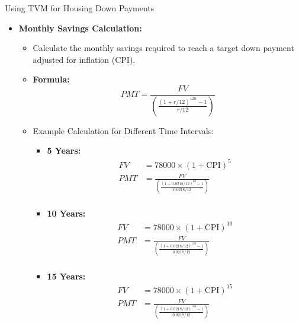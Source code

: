 \documentclass{beamer}
\begin{document}
\begin{frame}{Using TVM for Housing Down Payments}
    \begin{itemize}
        \item \textbf{Monthly Savings Calculation:}
        \begin{itemize}
            \item Calculate the monthly savings required to reach a target down payment adjusted for inflation (CPI).
            \item \textbf{Formula:}
            \begin{equation*}
                PMT = \frac{FV}{\left( \frac{(1 + r/12)^{12n} - 1}{r/12} \right)}
            \end{equation*}
            \item Example Calculation for Different Time Intervals:
            \begin{itemize}
                \item \textbf{5 Years:}
                \begin{align*}
                    FV &= 78000 \times (1 + \text{CPI})^5 \\
                    PMT &= \frac{FV}{\left( \frac{(1 + 0.0218/12)^{60} - 1}{0.0218/12} \right)} \\
                \end{align*}
                \item \textbf{10 Years:}
                \begin{align*}
                    FV &= 78000 \times (1 + \text{CPI})^{10} \\
                    PMT &= \frac{FV}{\left( \frac{(1 + 0.0218/12)^{120} - 1}{0.0218/12} \right)} \\
                \end{align*}
                \item \textbf{15 Years:}
                \begin{align*}
                    FV &= 78000 \times (1 + \text{CPI})^{15} \\
                    PMT &= \frac{FV}{\left( \frac{(1 + 0.0218/12)^{180} - 1}{0.0218/12} \right)} \\
                \end{align*}
            \end{itemize}
        \end{itemize}
    \end{itemize}
\end{frame}
\end{document}
